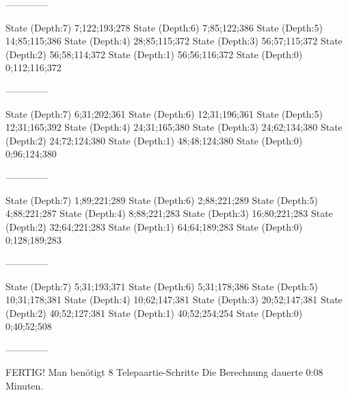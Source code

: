 \documentclass[a4paper,10pt,ngerman]{scrartcl}
\begin{document}
\begin{lstcs}
--------------

State (Depth:7) {7;122;193;278}
State (Depth:6) {7;85;122;386}
State (Depth:5) {14;85;115;386}
State (Depth:4) {28;85;115;372}
State (Depth:3) {56;57;115;372}
State (Depth:2) {56;58;114;372}
State (Depth:1) {56;56;116;372}
State (Depth:0) {0;112;116;372}

--------------

State (Depth:7) {6;31;202;361}
State (Depth:6) {12;31;196;361}
State (Depth:5) {12;31;165;392}
State (Depth:4) {24;31;165;380}
State (Depth:3) {24;62;134;380}
State (Depth:2) {24;72;124;380}
State (Depth:1) {48;48;124;380}
State (Depth:0) {0;96;124;380}

--------------

State (Depth:7) {1;89;221;289}
State (Depth:6) {2;88;221;289}
State (Depth:5) {4;88;221;287}
State (Depth:4) {8;88;221;283}
State (Depth:3) {16;80;221;283}
State (Depth:2) {32;64;221;283}
State (Depth:1) {64;64;189;283}
State (Depth:0) {0;128;189;283}

--------------

State (Depth:7) {5;31;193;371}
State (Depth:6) {5;31;178;386}
State (Depth:5) {10;31;178;381}
State (Depth:4) {10;62;147;381}
State (Depth:3) {20;52;147;381}
State (Depth:2) {40;52;127;381}
State (Depth:1) {40;52;254;254}
State (Depth:0) {0;40;52;508}

--------------


FERTIG!
Man benötigt 8 Telepaartie-Schritte
Die Berechnung dauerte 0:08 Minuten.
\end{lstcs}
\end{document}
